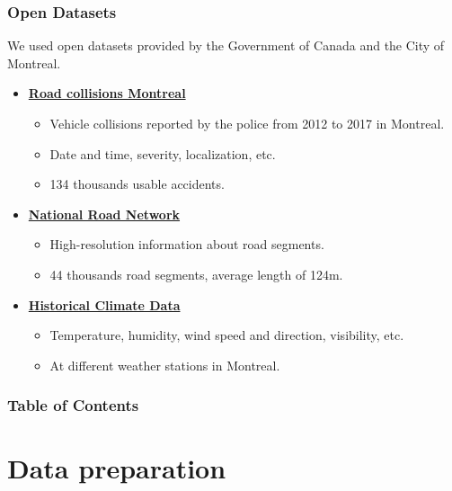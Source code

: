 \documentclass[slidestop,compress,red,mathserif]{beamer}
\begin{document}
\begin{frame}
\frametitle{Open Datasets}

\begin{footnotesize}
We used open datasets provided by the Government of Canada and the City of Montreal.

\begin{itemize}
\item[] \textbf{\href{http://donnees.ville.montreal.qc.ca/dataset/collisions-routieres}{Road collisions Montreal}}
  \begin{itemize}
  	\item Vehicle collisions reported by the police from 2012 to 2017 in Montreal.
  	\item Date and time, severity, localization, etc.
  	\item 134 thousands usable accidents.
  \end{itemize}
\item[] \textbf{\href{https://open.canada.ca/data/en/dataset/3d282116-e556-400c-9306-ca1a3cada77f}{National Road Network}}
  \begin{itemize}
    \item High-resolution information about road segments.
    \item 44 thousands road segments, average length of 124m.
  \end{itemize}
\item[] \textbf{\href{https://climate.weather.gc.ca}{Historical Climate Data}}
  \begin{itemize}
    \item Temperature, humidity, wind speed and direction, visibility, etc. 
    \item At different weather stations in Montreal.
  \end{itemize}
\end{itemize}

\end{footnotesize}

\end{frame}

\begin{frame}
  \frametitle{Table of Contents}
  \tableofcontents
\end{frame}


\section{Data preparation}
\end{document}
